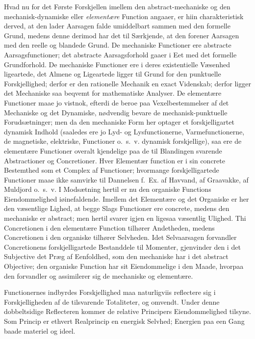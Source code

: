 \documentclass[12pt]{book}
\newcommand{\apage}[1]{\marginnote{\footnotesize\textit{[#1]}}}
\begin{document}
Hvad nu for det Første Forskjellen imellem den abstract-mechaniske og den mechanisk-dynamiske
eller \emph{elementære} Function angaaer, er hiin charakteristisk derved, at den lader Aarsagen
falde umiddelbart sammen med den formelle Grund, medens denne derimod har det til Særkjende, at
den forener Aarsagen med den reelle og blandede Grund. De mechaniske Functioner ere abstracte
Aarsagsfunctioner; det abstracte Aarsagsforhold gaaer i Eet med det formelle Grundforhold. De
mechaniske Functioner ere i deres existentielle Væsenhed ligeartede, det Almene og Ligeartede
ligger til Grund for den punktuelle Forskjellighed; derfor er den rationelle Mechanik en exact
Videnskab; derfor ligger det Mechaniske saa beqvemt for mathematiske Analyser. De elementære
Functioner maae jo vistnok, efterdi de beroe paa Vexelbestemmelser af det Mechaniske og det
Dynamiske, nødvendig bevare de mechanisk-punktuelle Forudsætninger; men da den mechaniske Form
her optager et forskjelligartet dynamisk Indhold (saaledes ere jo Lyd- og Lysfunctionerne,
Varmefunctionerne, de magnetiske, elektriske, Functioner o.\ s.\ v. dynamisk forskjellige), saa
ere de elementære Functioner overalt kjendelige paa de til Blandingen svarende Abstractioner og
Concretioner. Hver \apage{402} Elementær\-%
function er i sin concrete Bestemthed som et Complex af Functioner; hvormange forskjelligartede
Functioner maae ikke samvirke til Dannelsen f.\ Ex. af Havvand, af Graavakke, af Muldjord
o.\ s.\ v. I Modsætning hertil er nu den organiske Functions Eiendommelighed iøinefaldende.
Imellem det Elementære og det Organiske er her den væsentlige Lighed, at begge Slags Functioner
ere concrete, medens den mechaniske er abstract; men hertil svarer igjen en ligesaa væsentlig
Ulighed. Thi Concretionen i den elementære Function tilhører Andetheden, medens Concretionen i
den organiske tilhører Selvheden. Idet Selvaarsagen forvandler Concretionens forskjelligartede
Bestanddele til Momenter, gjenvinder den i det Subjective det Præg af Eenfoldhed, som den
mechaniske har i det abstract Objective; den organiske Function har sit Eiendommelige i den
Maade, hvorpaa den forvandler og assimilerer sig de mechaniske og elementære.

Functionernes indbyrdes Forskjellighed maa naturligviis reflectere sig i Forskjelligheden af de
tilsvarende Totaliteter, og omvendt. Under denne dobbeltsidige Reflecteren kommer de relative
Principers Eiendommelighed tilsyne. Som Princip er ethvert Realprincip en energisk Selvhed;
Energien paa een Gang baade materiel og ideel.
\end{document}
